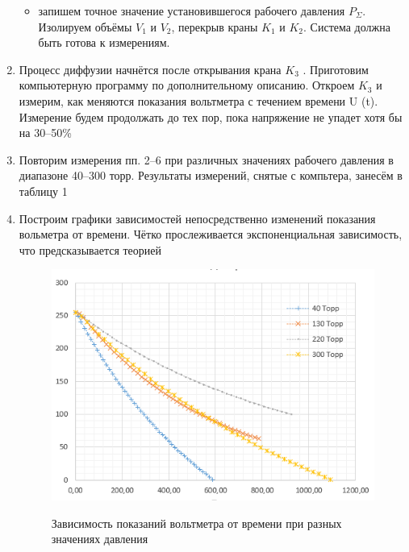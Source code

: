 \documentclass[12pt,a4paper]{article}
\begin{document}
\begin{enumerate}
\begin{itemize}
\item запишем точное значение установившегося рабочего давления $P_{\Sigma}$. Изолируем объёмы $V_1$ и $V_2$, перекрыв краны $K_1$ и $K_2$. Система должна быть готова к измерениям.
\end{itemize}
\item Процесс диффузии начнётся после открывания крана $K_3$ . Приготовим компьютерную программу по дополнительному описанию. Откроем $K_3$ и измерим, как меняются показания вольтметра с течением времени U (t). Измерение будем продолжать до тех пор, пока напряжение не упадет хотя бы на 30–50\%
\item  Повторим измерения пп. 2–6 при различных значениях рабочего давления в диапазоне 40–300 торр. Результаты измерений, снятые с компьтера, занесём в таблицу 1

\item Построим графики зависимостей непосредственно изменений показания вольметра от времени. Чётко прослеживается экспоненциальная зависимость, что предсказывается теорией
\begin{figure}[h]
    \centering
    \begin{center}
    \caption{Зависимость показаний вольтметра от времени при разных значениях давления}
    \end{center}
    \includegraphics[width=\textwidth]{exp.PNG}
    \label{fig:vac}
\end{figure} 


\end{enumerate}
\end{document}
